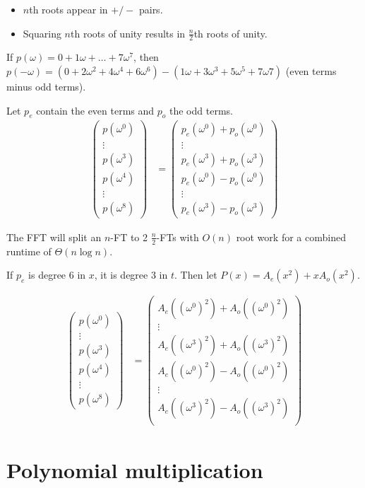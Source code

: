 \begin{itemize}
	\item \(n\)th roots appear in \(+/-\) pairs.
	\item Squaring \(n\)th roots of unity results in \(\frac{n}{2}\)th roots of unity.
\end{itemize}

If \(p(\omega) = 0 + 1\omega + \ldots + 7\omega^7\), then \(p(-\omega) = \left(0 + 2\omega^2 + 4\omega^4 + 6 \omega^6\right) - \left(1\omega + 3\omega^3 + 5\omega^5 + 7\omega7\right)\) (even terms minus odd terms).

Let \(p_e\) contain the even terms and \(p_o\) the odd terms.
\begin{align}
	\begin{pmatrix}
		p(\omega^0)\\
		\vdots\\
		p(\omega^3)\\
		p(\omega^4)\\
		\vdots\\
		p(\omega^8)
	\end{pmatrix}
	&=
	\begin{pmatrix}
		p_e(\omega^0) + p_o(\omega^0) \\
		\vdots \\
		p_e(\omega^3) + p_o(\omega^3) \\
		p_e(\omega^0) - p_o(\omega^0) \\
		\vdots \\
		p_e(\omega^3) - p_o(\omega^3)
	\end{pmatrix}
\end{align}

The FFT will split an \(n\)-FT to 2 \(\frac{n}{2}\)-FTs with \(O(n)\) root work for a combined runtime of \(\Theta(n\log n)\).

If \(p_e\) is degree 6 in \(x\), it is degree 3 in \(t\). Then let \(P(x) = A_e\left(x^2\right) + xA_o\left(x^2\right)\).

\begin{align}
\begin{pmatrix}
p(\omega^0)\\
\vdots\\
p(\omega^3)\\
p(\omega^4)\\
\vdots\\
p(\omega^8)
\end{pmatrix}
&=
\begin{pmatrix}
A_e\left(\left(\omega^0\right)^2\right) + A_o\left(\left(\omega^0\right)^2\right) \\
\vdots \\
A_e\left(\left(\omega^3\right)^2\right) + A_o\left(\left(\omega^3\right)^2\right) \\
A_e\left(\left(\omega^0\right)^2\right) - A_o\left(\left(\omega^0\right)^2\right) \\
\vdots \\
A_e\left(\left(\omega^3\right)^2\right) - A_o\left(\left(\omega^3\right)^2\right) \\
\end{pmatrix}
\end{align}
\section{Polynomial multiplication}
